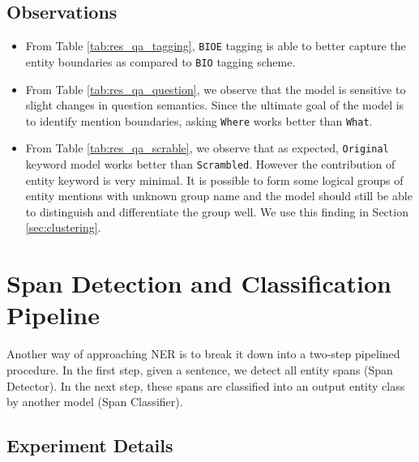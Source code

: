 \subsection{Observations}
\begin{itemize}
    \item From Table \ref{tab:res_qa_tagging}, \texttt{BIOE} tagging is able to better capture the entity boundaries as compared to \texttt{BIO} tagging scheme.
    
    \item From Table \ref{tab:res_qa_question}, we observe that the model is sensitive to slight changes in question semantics. Since the ultimate goal of the model is to identify mention boundaries, asking \texttt{Where} works better than \texttt{What}. 
    
    \item From Table \ref{tab:res_qa_scrable}, we observe that as expected, \texttt{Original} keyword model works better than \texttt{Scrambled}. However the contribution of entity keyword is very minimal. It is possible to form some logical groups of entity mentions with unknown group name and the model should still be able to distinguish and differentiate the group well. We use this finding in Section \ref{sec:clustering}.
\end{itemize}

\section{Span Detection and Classification Pipeline}
\label{sec:span_pipeline}

Another way of approaching NER is to break it down into a two-step pipelined procedure. In the first step, given a sentence, we detect all entity spans (Span Detector). In the next step, these spans are classified into an output entity class by another model (Span Classifier).

\subsection{Experiment Details}


